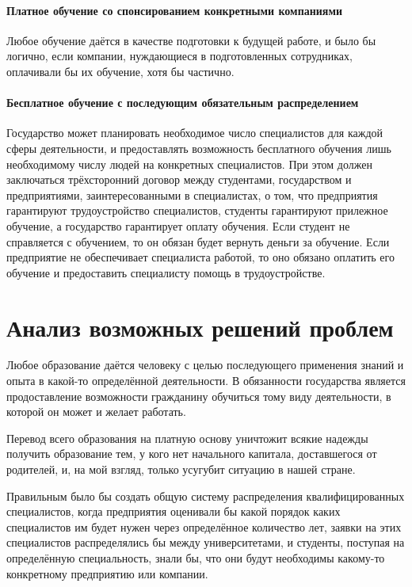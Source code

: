 \documentclass[10pt,a4paper,titlepage]{article}
\begin{document}
\paragraph{Платное обучение со спонсированием конкретными компаниями}
Любое обучение даётся в качестве подготовки к будущей работе, и было бы логично, 
если компании, нуждающиеся в подготовленных сотрудниках, оплачивали бы их обучение, хотя бы частично.

\paragraph{Бесплатное обучение с последующим обязательным распределением}
Государство может планировать необходимое число специалистов для каждой сферы деятельности, 
и предоставлять возможность бесплатного обучения лишь необходимому числу людей на конкретных специалистов.
При этом должен заключаться трёхсторонний договор между студентами, государством и предприятиями, 
заинтересованными в специалистах, о том, что предприятия гарантируют трудоустройство специалистов, 
студенты гарантируют прилежное обучение, а государство гарантирует оплату обучения.
Если студент не справляется с обучением, то он обязан будет вернуть деньги за обучение.
Если предприятие не обеспечивает специалиста работой, то оно обязано оплатить его обучение и
предоставить специалисту помощь в трудоустройстве.

\section*{Анализ возможных решений проблем}
Любое образование даётся человеку с целью последующего применения знаний и опыта в какой-то определённой деятельности.
В обязанности государства является продоставление возможности гражданину обучиться тому виду деятельности, 
в которой он может и желает работать. 

Перевод всего образования на платную основу уничтожит всякие надежды получить образование тем, 
у кого нет начального капитала, доставшегося от родителей, 
и, на мой взгляд, только усугубит ситуацию в нашей стране.

Правильным было бы создать общую систему распределения квалифицированных специалистов, 
когда предприятия оценивали бы какой порядок каких специалистов им будет нужен через определённое количество лет,
заявки на этих специалистов распределялись бы между университетами, 
и студенты, поступая на определённую специальность, знали бы, 
что они будут необходимы какому-то конкретному предприятию или компании.
\end{document}
